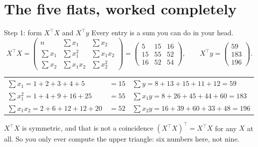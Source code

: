 \documentclass[aspectratio=169]{beamer}
\newcommand{\Xt}{X^{\!\top}}
\begin{document}
\section[By hand]{The five flats, worked completely}
\label{sec:hand}

\begin{frame}[shrink=6]{Step 1: form $\Xt X$ and $\Xt y$}
  Every entry is a sum you can do in your head.
  \[
    \Xt X =
    \begin{pmatrix}
      n & \sum x_1 & \sum x_2\\
      \sum x_1 & \sum x_1^2 & \sum x_1x_2\\
      \sum x_2 & \sum x_1x_2 & \sum x_2^2
    \end{pmatrix}
    =
    \begin{pmatrix} 5 & 15 & 16\\ 15 & 55 & 52\\ 16 & 52 & 54 \end{pmatrix},
    \qquad
    \Xt y = \begin{pmatrix} 59\\ 183\\ 196 \end{pmatrix}.
  \]
  \begin{center}\small
  \begin{tabular}{@{}lrl@{}}
    \toprule
    $\sum x_1 = 1{+}2{+}3{+}4{+}5$ & $= 15$ & $\sum y = 8{+}13{+}15{+}11{+}12 = 59$\\
    $\sum x_1^2 = 1{+}4{+}9{+}16{+}25$ & $= 55$ & $\sum x_1 y = 8{+}26{+}45{+}44{+}60 = 183$\\
    $\sum x_1x_2 = 2{+}6{+}12{+}12{+}20$ & $= 52$ & $\sum x_2 y = 16{+}39{+}60{+}33{+}48 = 196$\\
    \bottomrule
  \end{tabular}
  \end{center}
  \begin{block}{$\Xt X$ is symmetric, and that is not a coincidence}
    \small $(\Xt X)^{\!\top} = \Xt X$ for any $X$ at all. So you only ever
    compute the upper triangle: six numbers here, not nine.
  \end{block}
\end{frame}
\end{document}
